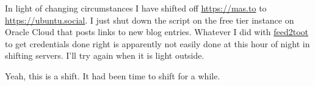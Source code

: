 In light of changing circumstances I have shifted off
\url{https://mas.to} to \url{https://ubuntu.social}. I just shut down
the script on the free tier instance on Oracle Cloud that posts links to
new blog entries. Whatever I did with
\href{https://gitlab.com/chaica/feed2toot}{feed2toot} to get credentials
done right is apparently not easily done at this hour of night in
shifting servers. I'll try again when it is light outside.

Yeah, this is a shift. It had been time to shift for a while.
